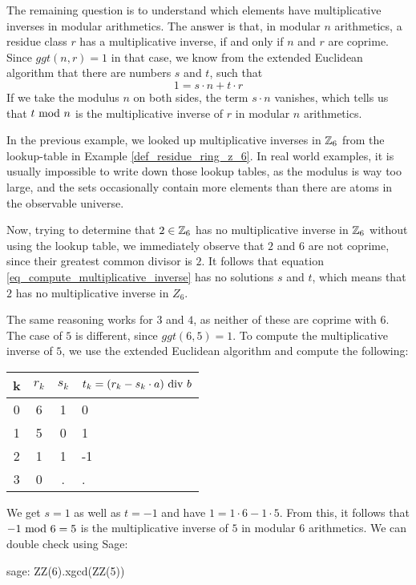 The remaining question is to understand which elements have multiplicative inverses in modular arithmetics. The answer is that, in modular $n$ arithmetics, a residue class $r$ has a multiplicative inverse, if and only if $n$ and $r$ are coprime. Since $ggt(n,r)=1$ in that case, we know from the extended Euclidean algorithm that there are numbers $s$ and $t$, such that 
\begin{equation}
\label{eq_compute_multiplicative_inverse}
1 = s\cdot n + t\cdot r
\end{equation}
If we take the modulus $n$ on both sides, the term $s\cdot n$ vanishes, which tells us that $t \text{ mod } n$ is the multiplicative inverse of $r$ in modular $n$ arithmetics.
\begin{example} In the previous example, we looked up multiplicative inverses in $\mathbb{Z}_6$ from the lookup-table in Example \ref{def_residue_ring_z_6}. In real world examples, it is  usually impossible to write down those lookup tables, as the modulus is way too large, and the sets occasionally contain more elements than there are atoms in the observable universe.

Now, trying to determine that $2\in \mathbb{Z}_6$ has no multiplicative inverse in $\mathbb{Z}_6$ without using the lookup table, we immediately observe that $2$ and $6$ are not coprime, since their greatest common divisor is $2$. It follows that equation \ref{eq_compute_multiplicative_inverse} has no solutions $s$ and $t$, which means that $2$ has no multiplicative inverse in $Z_6$.

The same reasoning works for $3$ and $4$, as neither of these are coprime with $6$. The case of  $5$ is different, since $ggt(6,5)=1$. To compute the multiplicative inverse of $5$, we use the extended Euclidean algorithm and compute  the following:
\begin{center}
  \begin{tabular}{c | c c l}
    k & $ r_k $ & $ s_k $ & $ t_k = (r_k-s_k \cdot a) \text{ div } b $ \\\hline
    0 & 6 & 1 & 0 \\
    1 & 5 & 0 & 1 \\
    2 & 1 & 1 & -1 \\
    3 & 0 & . & . \\
  \end{tabular}
\end{center}

We get $s=1$ as well as $t=-1$ and have $1 = 1\cdot 6 -1\cdot 5$. From this, it follows that $-1 \text{ mod } 6=5$ is the multiplicative inverse of $5$ in modular $6$ arithmetics. We can double check using Sage:
\begin{sagecommandline}
sage: ZZ(6).xgcd(ZZ(5))
\end{sagecommandline}
\end{example}
